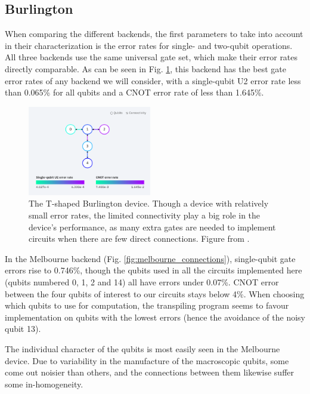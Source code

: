 \subsection{Burlington}
When comparing the different backends, the first parameters to take into account
in their characterization is the error rates for single- and two-qubit
operations. All three backends use the same universal gate set, which make their
error rates directly comparable. As can be seen in Fig.
\ref{fig:burlington_connections}, this backend has the best gate error rates of
any backend we will consider, with a single-qubit U2 error rate less than 0.065\%
for all qubits and a CNOT error rate of less than 1.645\%. 

\begin{figure}[h]
  \centering \includegraphics[width=0.48\textwidth]{images/connection_diagram_burlington.png}
  \caption{The T-shaped Burlington device. Though a device with relatively small
    error rates, the limited connectivity play a big role in the device's
    performance, as many extra gates are needed to implement circuits when there
    are few direct connections. Figure from \cite{ibmq_burlington}.}
  \label{fig:burlington_connections}
\end{figure}

In the Melbourne backend (Fig. \ref{fig:melbourne_connections}), single-qubit
gate errors rise to 0.746\%, though the qubits used in all the circuits
implemented here (qubits numbered 0, 1, 2 and 14) all have errors under 0.07\%.
CNOT error between the four qubits of interest to our circuits stays below 4\%.
When choosing which qubits to use for computation, the transpiling program
seems to favour implementation on qubits with the lowest errors (hence the
avoidance of the noisy qubit 13).

The individual character of the qubits is most easily seen in the Melbourne
device. Due to variability in the manufacture of the macroscopic qubits, some
come out noisier than others, and the connections between them likewise suffer
some in-homogeneity.

